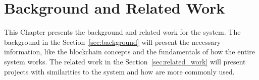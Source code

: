 \chapter{Background and Related Work}\label{ch:background_and_related_work}

This Chapter presents the background and related work for the system. The
background in the Section~\ref{sec:background} will present the necessary
information, like the blockchain concepts and the fundamentals of how the
entire system works. The related work in the Section~\ref{sec:related_work}
will present projects with similarities to the system and how 
are more commonly used.




